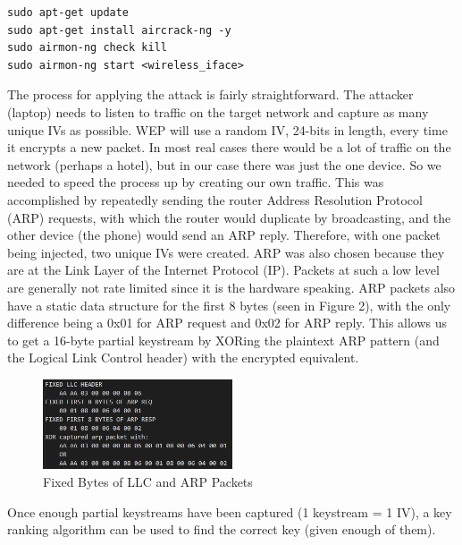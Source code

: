 \documentclass[10pt, titlepage]{article}
\begin{document}
\begin{verbatim}
sudo apt-get update
sudo apt-get install aircrack-ng -y
sudo airmon-ng check kill
sudo airmon-ng start <wireless_iface>
\end{verbatim}

The process for applying the attack is fairly straightforward. The attacker (laptop) needs to listen to traffic on the target network and capture as many unique IVs as possible. WEP will use a random IV, 24-bits in length, every time it encrypts a new packet. In most real cases there would be a lot of traffic on the network (perhaps a hotel), but in our case there was just the one device. So we needed to speed the process up by creating our own traffic. This was accomplished by repeatedly sending the router Address Resolution Protocol (ARP) requests, with which the router would duplicate by broadcasting, and the other device (the phone) would send an ARP reply. Therefore, with one packet being injected, two unique IVs were created. ARP was also chosen because they are at the Link Layer of the Internet Protocol (IP). Packets at such a low level are generally not rate limited since it is the hardware speaking. ARP packets also have a static data structure for the first 8 bytes (seen in Figure 2), with the only difference being a 0x01 for ARP request and 0x02 for ARP reply. This allows us to get a 16-byte partial keystream by XORing the plaintext ARP pattern (and the Logical Link Control header) with the encrypted equivalent.\\

\begin{figure}[H]
 	\centering
    \includegraphics[width=0.5\textwidth]{./images/fixed-bytes.png}
    \caption{Fixed Bytes of LLC and ARP Packets}
\end{figure}

Once enough partial keystreams have been captured (1 keystream = 1 IV), a key ranking algorithm can be used to find the correct key (given enough of them). 
\end{document}
